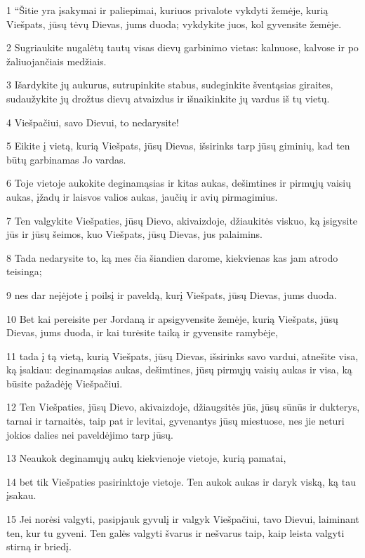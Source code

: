 \par 1 “Šitie yra įsakymai ir paliepimai, kuriuos privalote vykdyti žemėje, kurią Viešpats, jūsų tėvų Dievas, jums duoda; vykdykite juos, kol gyvensite žemėje. 
\par 2 Sugriaukite nugalėtų tautų visas dievų garbinimo vietas: kalnuose, kalvose ir po žaliuojančiais medžiais. 
\par 3 Išardykite jų aukurus, sutrupinkite stabus, sudeginkite šventąsias giraites, sudaužykite jų drožtus dievų atvaizdus ir išnaikinkite jų vardus iš tų vietų. 
\par 4 Viešpačiui, savo Dievui, to nedarysite! 
\par 5 Eikite į vietą, kurią Viešpats, jūsų Dievas, išsirinks tarp jūsų giminių, kad ten būtų garbinamas Jo vardas. 
\par 6 Toje vietoje aukokite deginamąsias ir kitas aukas, dešimtines ir pirmųjų vaisių aukas, įžadų ir laisvos valios aukas, jaučių ir avių pirmagimius. 
\par 7 Ten valgykite Viešpaties, jūsų Dievo, akivaizdoje, džiaukitės viskuo, ką įsigysite jūs ir jūsų šeimos, kuo Viešpats, jūsų Dievas, jus palaimins. 
\par 8 Tada nedarysite to, ką mes čia šiandien darome, kiekvienas kas jam atrodo teisinga; 
\par 9 nes dar neįėjote į poilsį ir paveldą, kurį Viešpats, jūsų Dievas, jums duoda. 
\par 10 Bet kai pereisite per Jordaną ir apsigyvensite žemėje, kurią Viešpats, jūsų Dievas, jums duoda, ir kai turėsite taiką ir gyvensite ramybėje, 
\par 11 tada į tą vietą, kurią Viešpats, jūsų Dievas, išsirinks savo vardui, atnešite visa, ką įsakiau: deginamąsias aukas, dešimtines, jūsų pirmųjų vaisių aukas ir visa, ką būsite pažadėję Viešpačiui. 
\par 12 Ten Viešpaties, jūsų Dievo, akivaizdoje, džiaugsitės jūs, jūsų sūnūs ir dukterys, tarnai ir tarnaitės, taip pat ir levitai, gyvenantys jūsų miestuose, nes jie neturi jokios dalies nei paveldėjimo tarp jūsų. 
\par 13 Neaukok deginamųjų aukų kiekvienoje vietoje, kurią pamatai, 
\par 14 bet tik Viešpaties pasirinktoje vietoje. Ten aukok aukas ir daryk viską, ką tau įsakau. 
\par 15 Jei norėsi valgyti, pasipjauk gyvulį ir valgyk Viešpačiui, tavo Dievui, laiminant ten, kur tu gyveni. Ten galės valgyti švarus ir nešvarus taip, kaip leista valgyti stirną ir briedį. 
